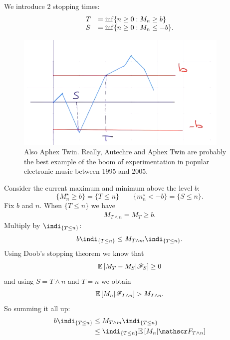 \documentclass{report}
\begin{document}
\begin{fancyproof}
	We introduce 2 stopping times: 
	\begin{equation*}
		\begin{array}{l l}
			T&=\inf\{n\geq0:M_{n}\geq b\}\\
			S&=\inf\{n\geq0:M_{n}\leq-b\}.
		\end{array}
	\end{equation*}
	\begin{figure}[H]
		\centering
		\includegraphics[width=0.6\linewidth]{screenshot019}
		\caption{Also Aphex Twin. Really, Autechre and Aphex Twin are probably the best example of the boom of experimentation in popular electronic music between 1995 and 2005.}
		\label{fig:screenshot019}
	\end{figure}
	Consider the current maximum and minimum above the level $b$:
	\begin{equation*}
		\{M^{\star}_{n}\geq b\}=\{T\leq n\}\qquad	\{m^{\star}_{n}<-b\}=\{S\leq n\}.
	\end{equation*}
	Fix $b$ and $n$. When $\{T\leq n\}$ we have
	\begin{align*}
		M_{T\wedge n}=M_{T}\geq b.
	\end{align*}
	Multiply by $\indi_{\{T\leq n\}}$:
	\begin{equation*}
		b\indi_{\{T\leq n\}}\leq M_{T\wedge m}\indi_{\{T\leq n\}}.
	\end{equation*}
	Using Doob's stopping theorem we know that 
	\begin{equation*}
		\mathbb{E}\left[M_{T}-M_{S}|\mathscr{F}_{S}\right]\geq0
	\end{equation*}
	and using $S=T\wedge n$ and $T=n$ we obtain
	\begin{equation*}
		\mathbb{E}\left[M_{n}|\mathscr{F}_{T\wedge n}\right]>M_{T\wedge n}.
	\end{equation*}
	So summing it all up:
	\begin{align*}
		b\indi_{\{T\leq n\}}&\leq M_{T\wedge m}\indi_{\{T\leq n\}}\\
		&\leq\indi_{\{T\leq n\}}\ev\left[M_{n}|\F_{T\wedge n}\right]\\

\end{align*}
\end{fancyproof}
\end{document}
